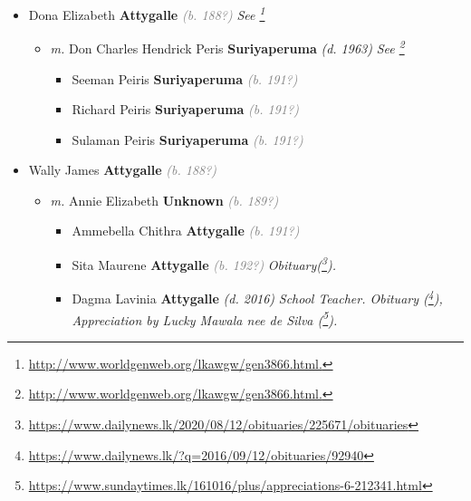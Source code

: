 \documentclass[10pt, openany]{book}
\begin{document}
\begin{itemize}
{\begin{itemize}
\item{Dona Elizabeth \textbf{Attygalle} \textcolor{gray}{\textit{(b. 188?)}} \textcolor{slmaroon}{\textit{See \footnote{\url{http://www.worldgenweb.org/lkawgw/gen3866.html.}}}}
\begin{itemize}
\item{\textit{m.} Don Charles Hendrick Peris \textbf{Suriyaperuma} \textcolor{slorange}{\textit{(d. 1963)}} \textcolor{slmaroon}{\textit{See \footnote{\url{http://www.worldgenweb.org/lkawgw/gen3866.html.}}}}   \label{couple:00000103:00000844} \begin{itemize}
\item{Seeman Peiris \textbf{Suriyaperuma} \textcolor{gray}{\textit{(b. 191?)}}
  }
\item{Richard Peiris \textbf{Suriyaperuma} \textcolor{gray}{\textit{(b. 191?)}}
  }
\item{Sulaman Peiris \textbf{Suriyaperuma} \textcolor{gray}{\textit{(b. 191?)}}
  }
\end{itemize}}
\end{itemize}
  }
\item{Wally James  \textbf{Attygalle} \textcolor{gray}{\textit{(b. 188?)}}
\begin{itemize}
\item{\textit{m.} Annie Elizabeth \textbf{Unknown} \textcolor{gray}{\textit{(b. 189?)}}   \label{couple:00000116:00000860} \begin{itemize}
\item{Ammebella Chithra \textbf{Attygalle} \textcolor{gray}{\textit{(b. 191?)}}
  }
\item{Sita Maurene \textbf{Attygalle} \textcolor{gray}{\textit{(b. 192?)}} \textcolor{slmaroon}{\textit{Obituary(\footnote{\url{https://www.dailynews.lk/2020/08/12/obituaries/225671/obituaries}}).}}
  }
\item{Dagma Lavinia  \textbf{Attygalle} \textcolor{slorange}{\textit{(d. 2016)}} \textcolor{slmaroon}{\textit{School Teacher.
Obituary (\footnote{\url{https://www.dailynews.lk/?q=2016/09/12/obituaries/92940}}), Appreciation by Lucky Mawala nee de Silva (\footnote{\url{https://www.sundaytimes.lk/161016/plus/appreciations-6-212341.html}}).}}
   }

\end{itemize}}
\end{itemize}}
\end{itemize}}
\end{itemize}
\end{document}
